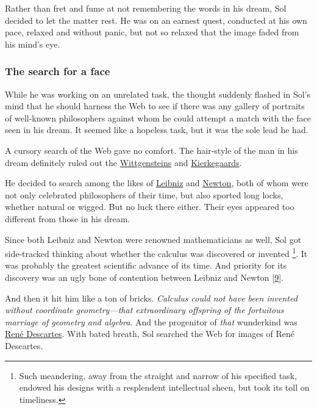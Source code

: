 \documentclass[
  a4paper,
]{article}
\begin{document}
Rather than fret and fume at not remembering the words in his dream, Sol
decided to let the matter rest. He was on an earnest quest, conducted at
his own pace, relaxed and without panic, but not so relaxed that the
image faded from his mind's eye. \emojifont🙂\normalfont

\hypertarget{the-search-for-a-face}{%
\subsubsection{The search for a face}\label{the-search-for-a-face}}

While he was working on an unrelated task, the thought suddenly flashed
in Sol's mind that he should harness the Web to see if there was any
gallery of portraits of well-known philosophers against whom he could
attempt a match with the face seen in his dream. It seemed like a
hopeless task, but it was the sole lead he had.

A cursory search of the Web gave no comfort. The hair-style of the man
in his dream definitely ruled out the
\href{https://tinyurl.com/y2sn8uzb}{Wittgensteins} and
\href{https://tinyurl.com/y3xdx3gl}{Kierkegaards}.

He decided to search among the likes of
\href{https://tinyurl.com/yxomtbt5}{Leibniz} and
\href{https://tinyurl.com/y5lc2fyx}{Newton}, both of whom were not only
celebrated philosophers of their time, but also sported long locks,
whether natural or wigged. But no luck there either. Their eyes appeared
too different from those in his dream.

Since both Leibniz and Newton were renowned mathematicians as well, Sol
got side-tracked thinking about whether the calculus was discovered or
invented \footnote{Such meandering, away from the straight and narrow of
  his specified task, endowed his designs with a resplendent
  intellectual sheen, but took its toll on timeliness.}. It was probably
the greatest scientific advance of its time. And priority for its
discovery was an ugly bone of contention between Leibniz and Newton
{[}\protect\hyperlink{ref-bardi2007}{9}{]}.

And then it hit him like a ton of bricks. \emph{Calculus could not have
been invented without coordinate geometry---that extraordinary offspring
of the fortuitous marriage of geometry and algebra}. And the progenitor
of \emph{that} wunderkind was
\href{https://en.wikipedia.org/wiki/Ren\%C3\%A9_Descartes}{René
Descartes}. With bated breath, Sol searched the Web for images of René
Descartes.
\end{document}
